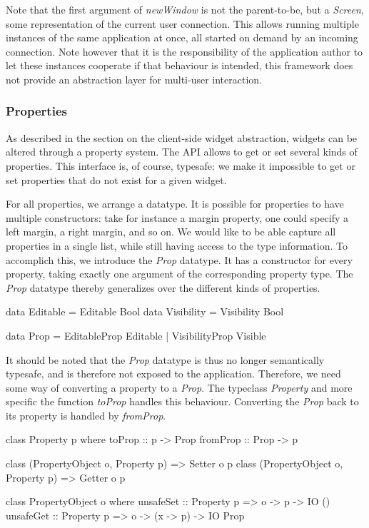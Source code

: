 \documentclass[11pt,a4paper]{article}
\begin{document}
Note that the first argument of \textit{newWindow} is not the parent-to-be, but a \textit{Screen}, some representation of the current user connection.
This allows running multiple instances of the same application at once, all started on demand by an incoming connection.
Note however that it is the responsibility of the application author to let these instances cooperate if that behaviour is intended, this framework does not provide an abstraction layer for multi-user interaction.

\subsubsection{Properties}
As described in the section on the client-side widget abstraction, widgets can be altered through a property system.
The API allows to get or set several kinds of properties.
This interface is, of course, typesafe: we make it impossible to get or set properties that do not exist for a given widget.

For all properties, we arrange a datatype.
It is possible for properties to have multiple constructors: take for instance a margin property, one could specify a left margin, a right margin, and so on.
We would like to be able capture all properties in a single list, while still having access to the type information.
To accomplich this, we introduce the \textit{Prop} datatype.
It has a constructor for every property, taking exactly one argument of the corresponding property type.
The \textit{Prop} datatype thereby generalizes over the different kinds of properties.

\begin{haskell}
data Editable = Editable Bool
data Visibility = Visibility Bool

data Prop = EditableProp Editable
          | VisibilityProp Visible
\end{haskell}

It should be noted that the \textit{Prop} datatype is thus no longer semantically typesafe, and is therefore not exposed to the application.
Therefore, we need some way of converting a property to a \textit{Prop}.
The typeclass \textit{Property} and more specific the function \textit{toProp} handles this behaviour.
Converting the \textit{Prop} back to its property is handled by \textit{fromProp}.

\begin{haskell}
class Property p where
    toProp :: p -> Prop
    fromProp :: Prop -> p

class (PropertyObject o, Property p) => Setter o p
class (PropertyObject o, Property p) => Getter o p

class PropertyObject o where
    unsafeSet :: Property p => o -> p -> IO ()
    unsafeGet :: Property p => o -> (x -> p) -> IO Prop
\end{haskell}
\end{document}
